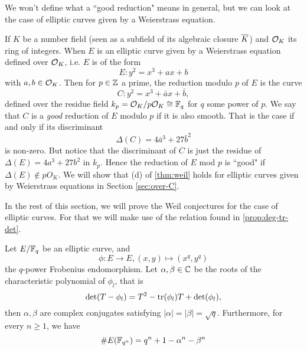 We won't define what a ``good reduction" means in general, but we can
look at the case of elliptic curves given by a Weierstrass equation.

If $K$ be a number field (seen as a subfield of its algebraic closure $\overline{K}$)
and $\mathcal{O}_K$ its ring of integers. When $E$ is an elliptic curve given by a
Weierstrass equation defined over $\mathcal{O}_K$, i.e. $E$ is of the form
\begin{equation*}
	E: y^2 = x^3 + ax + b
\end{equation*}
with $a, b \in \mathcal{O}_K$. Then for $p \in \mathbb{Z}$ a prime, the reduction modulo $p$
of $E$ is the curve
\begin{equation*}
	C: y^2 = x^3 + \bar{a}x + \bar{b},
\end{equation*}
defined over the residue field $k_p = \mathcal{O}_K/p\mathcal{O}_K \cong \mathbb{F}_q$ for $q$
some power of $p$.
We say that $C$ is a \emph{good} reduction of $E$ modulo $p$
if it is also smooth. That is the case if and only if its discriminant
\begin{equation*}
	\Delta(C) = 4\bar{a}^3 + 27\bar{b}^2
\end{equation*}
is non-zero. But notice that the discriminant of $C$ is just the residue
of $\Delta(E) = 4a^3 + 27b^2$ in $k_p$.
Hence the reduction of $E$ mod $p$ is ``good" if $\Delta(E) \not\in pO_K$.
We will show that (d) of \ref{thm:weil} holds for elliptic curves given
by Weierstrass equations in Section
\ref{sec:over-C}.

In the rest of this section, we will prove the Weil conjectures for the case
of elliptic curves. For that we will make use of the relation found in
\ref{prop:deg-tr-det}.

\begin{proposition}
	\label{prop:frob-char-poly}
	Let $E/\mathbb{F}_q$ be an elliptic curve, and
	\begin{equation*}
		\phi: E \to E, (x, y) \mapsto (x^q, y^q)
	\end{equation*}
	the $q$-power Frobenius endomorphism.
	Let $\alpha, \beta \in \mathbb{C}$ be the roots of the characteristic polynomial
	of $\phi_l$, that is
	\begin{equation*}
		\det(T - \phi_l) = T^2 - \operatorname{tr}(\phi_l)T + \det(\phi_l),
	\end{equation*}
	then $\alpha, \beta$ are complex conjugates satisfying
	$|\alpha| = |\beta| = \sqrt{q}$. Furthermore, for every $n \geq 1$, we
	have
	\begin{equation*}
		\#E(\mathbb{F}_{q^n}) = q^n + 1 - \alpha^n - \beta^n
	\end{equation*}
\end{proposition}

